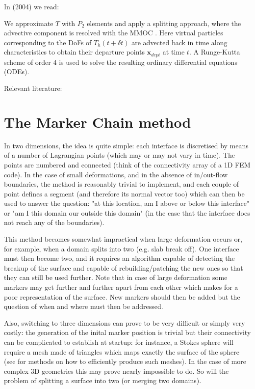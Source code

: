 In \textcite{ildk24} (2004) we read:
\begin{displayquote}
{\color{darkgray}
We approximate $T$ with $P_2$ elements and apply
a splitting approach, where the advective component is resolved with the
MMOC \cite{kome22}. Here virtual particles corresponding to the DoFs of $T_h(t +\delta t)$
are advected back in time along characteristics to obtain their departure points
${\bm x}_{dept}$ at time $t$. A Runge-Kutta scheme of order 4 is used to solve the resulting
ordinary differential equations (ODEs).}
\end{displayquote}

Relevant literature: 

\section{The Marker Chain method}

In two dimensions, the idea is quite simple: each interface is discretised by means of a number
of Lagrangian points (which may or may not vary in time). The points are numbered and 
connected (think of the connectivity array of a 1D FEM code). In the case of small deformations, 
and in the absence of in/out-flow boundaries, the method is reasonably trivial to implement, and 
each couple of point defines a segment (and therefore its normal vector too) which can then be used
to answer the question: "at this location, am I above or below this interface" or "am I this domain our
outside this domain" (in the case that the interface does not reach any of the boundaries).

This method becomes somewhat impractical when large deformation occurs or, for example, 
when a domain splits into two (e.g. slab break off). One interface must then become two, 
and it requires an algorithm capable of detecting the breakup of the surface and capable 
of rebuilding/patching the new ones so that they can still be used further. 
Note that in case of large deformation some markers may get further and further apart 
from each other which makes for a poor representation of the surface. New markers should then 
be added but the question of when and where must then be addressed.

Also, switching to three dimensions can prove to be very difficult or simply very 
costly: the generation of the inital marker position is trivial but their connectivity 
can be complicated to establish at startup: for instance, a Stokes sphere will require
a mesh made of triangles which maps exactly the surface of the sphere (see \cite{thie18,moma19} 
for methods on how to efficiently produce such meshes). In the case of more complex 3D geometries
this may prove nearly impossible to do. So will the problem of splitting a surface into two 
(or merging two domains).  

